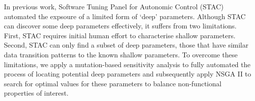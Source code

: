 In previous work, Software Tuning Panel for Autonomic Control (STAC)
\cite{Brake:2008:ADS:1370018.1370031} automated the expsoure of a
limited form of `deep' parameters. 
Although STAC
can discover some deep parameters effectively, it suffers from two
limitations. First, STAC requires initial human effort to characterise
shallow parameters. Second, STAC can only find a subset of deep parameters,
those that have similar data transition patterns to the known shallow
parameters. To overcome these limitations, we apply a mutation-based
sensitivity analysis to fully automated the process of locating potential
deep parameters and subsequently apply NSGA II to search for optimal values
for these parameters to balance non-functional properties of interest. 
